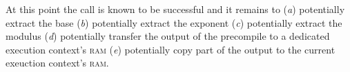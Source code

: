 

\begin{center}
\end{center}
At this point the \instModexp{} call is known to be successful and it remains to
(\emph{a}) potentially extract the base
(\emph{b}) potentially extract the exponent
(\emph{c}) potentially extract the modulus
(\emph{d}) potentially transfer the output of the precompile to a dedicated execution context's \textsc{ram}
(\emph{e}) potentially copy part of the output to the current exeuction context's \textsc{ram}.
